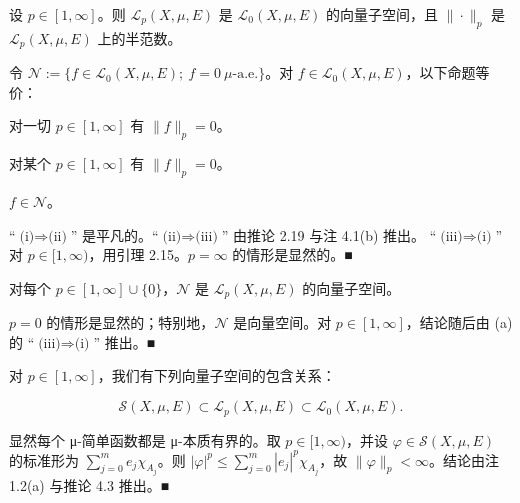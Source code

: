 \begin{corollary}

设 $ p \in [1,\infty] $。则 $ \mathcal{L}_p(X,\mu,E) $ 是 $ \mathcal{L}_0(X,\mu,E) $ 的向量子空间，且 $ \|\cdot\|_p $ 是 $ \mathcal{L}_p(X,\mu,E) $ 上的半范数。

\end{corollary}

\begin{remark}

\begin{items}
\item

令 $ \mathcal{N} := \{f \in \mathcal{L}_0(X,\mu,E) ;\ f = 0 \ \mu\text{-a.e.}\} $。对 $ f \in \mathcal{L}_0(X,\mu,E) $，以下命题等价：

\begin{subitems}
\item

对一切 $ p \in [1,\infty] $ 有 $ \|f\|_p = 0 $。

\item

对某个 $ p \in [1,\infty] $ 有 $ \|f\|_p = 0 $。

\item

$ f \in \mathcal{N} $。

\proofhead
“$ \text{(i)} \Rightarrow \text{(ii)} $” 是平凡的。“$ \text{(ii)} \Rightarrow \text{(iii)} $” 由推论 2.19 与注 4.1(b) 推出。
“$ \text{(iii)} \Rightarrow \text{(i)} $” 对 $ p \in [1,\infty) $，用引理 2.15。$ p = \infty $ 的情形是显然的。\nobreak\hspace{0.35em}■
\end{subitems}

\item

对每个 $ p \in [1,\infty] \cup \{0\} $，$ \mathcal{N} $ 是 $ \mathcal{L}_p(X,\mu,E) $ 的向量子空间。

\proofhead
$ p = 0 $ 的情形是显然的；特别地，$ \mathcal{N} $ 是向量空间。对 $ p \in [1,\infty] $，结论随后由 (a) 的 “$ \text{(iii)} \Rightarrow \text{(i)} $” 推出。\nobreak\hspace{0.35em}■
\item

对 $ p \in [1,\infty] $，我们有下列向量子空间的包含关系：

\[
\mathcal{S}(X,\mu,E) \subset \mathcal{L}_p(X,\mu,E) \subset \mathcal{L}_0(X,\mu,E) .
\]

\proofhead
显然每个 μ-简单函数都是 μ-本质有界的。取 $ p \in [1,\infty) $，并设 $ \varphi \in \mathcal{S}(X,\mu,E) $ 的标准形为 $ \sum_{j=0}^{m} e_j\chi_{A_j} $。则 $ |\varphi|^p \le \sum_{j=0}^{m}|e_j|^p\chi_{A_j} $，故 $ \|\varphi\|_p < \infty $。结论由注 1.2(a) 与推论 4.3 推出。\nobreak\hspace{0.35em}■
\end{items}

\end{remark}


